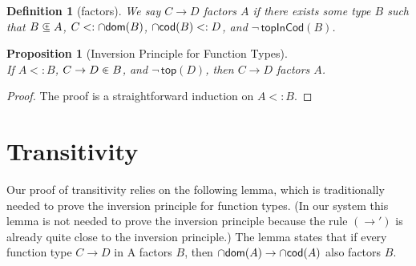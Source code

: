 \documentclass{article}
\newtheorem{proposition}[theorem]{Proposition}
\newtheorem{definition}[theorem]{Definition}
\begin{document}
\begin{definition}[factors]
  We say $C \to D$ \emph{factors} $A$
  if there exists some type $B$ such that
  $B \subsetpluseq A$, $C <: \cap\mathsf{dom}(B)$, $\cap\mathsf{cod}(B) <: D$, and
  $\neg\,\mathsf{topInCod}(B)$.
\end{definition}

\begin{proposition}[Inversion Principle for Function Types]
  \label{prop:⊑-fun-inv}\ \\
  If $A <: B$, $C \to D \inplus B$, and $\neg\,\mathsf{top}(D)$, then
  $C \to D$ factors $A$.
\end{proposition}
\begin{proof}
  The proof is a straightforward induction on $A <: B$.
\end{proof}

\section{Transitivity}
\label{sec:trans}

Our proof of transitivity relies on the following lemma, which is
traditionally needed to prove the inversion principle for function
types. (In our system this lemma is not needed to prove the inversion
principle because the rule $(\to')$ is already quite close to the
inversion principle.)  The lemma states that if every function type $C
\to D$ in A factors $B$, then $\cap\mathsf{dom}(A) \to \cap\mathsf{cod}(A)$ also factors $B$.
\end{document}

